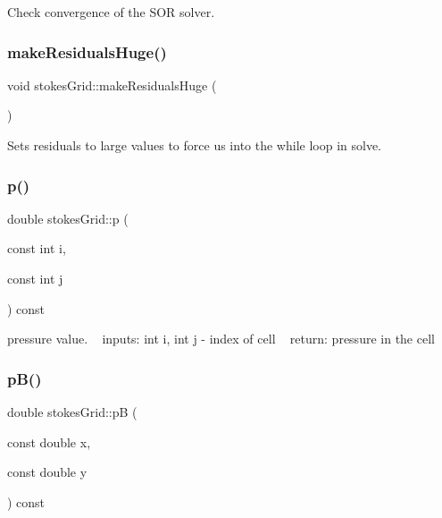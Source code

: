 Check convergence of the S\+OR solver. \mbox{\label{classstokesGrid_a7b5df7cd0927b5f6ab1b5e9297598bab}} 
\subsubsection{\texorpdfstring{make\+Residuals\+Huge()}{makeResidualsHuge()}}
{\footnotesize\ttfamily void stokes\+Grid\+::make\+Residuals\+Huge (\begin{DoxyParamCaption}{ }\end{DoxyParamCaption})}

Sets residuals to large values to force us into the while loop in solve. \mbox{\label{classstokesGrid_a3a88f709045b484f5a058d652890ca93}} 
\subsubsection{\texorpdfstring{p()}{p()}}
{\footnotesize\ttfamily double stokes\+Grid\+::p (\begin{DoxyParamCaption}\item[{const int}]{i,  }\item[{const int}]{j }\end{DoxyParamCaption}) const}

pressure value. ~\newline
inputs\+: int i, int j -\/ index of cell ~\newline
return\+: pressure in the cell \mbox{\label{classstokesGrid_a4ee64eaf9843bb919c9485761b2a8d1e}} 
\subsubsection{\texorpdfstring{p\+B()}{pB()}}
{\footnotesize\ttfamily double stokes\+Grid\+::pB (\begin{DoxyParamCaption}\item[{const double}]{x,  }\item[{const double}]{y }\end{DoxyParamCaption}) const}

